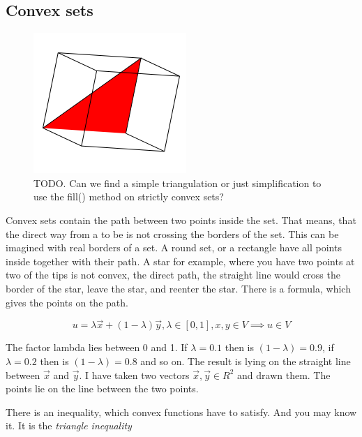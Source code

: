 \documentclass[a4paper]{article}
\begin{document}
\begin{Example}
\subsection{Convex sets}

\begin{flushleft}
\begin{figure}[ht]

\includegraphics[scale=0.5]{filling.png}
\caption{TODO. Can we find a simple triangulation or just simplification to use the fill() method on strictly convex sets?}

\end{figure}
\end{flushleft}


Convex sets contain the path between two points inside the set. That means, that the direct way from a to be is not crossing the borders of the set. This can be imagined with real borders of a set. A round set, or a rectangle have all points inside together with their path. A star for example, where you have two points at two of the tips is not convex, the direct path, the straight line would cross the border of the star, leave the star, and reenter the star. There is a formula, which gives the points on the path.

\begin{displaymath}
u = \lambda\vec{x} + (1-\lambda)\vec{y}, \lambda \in [0,1], x,y \in V \implies u \in V
\end{displaymath}

The factor lambda lies between 0 and 1. If $\lambda = 0.1$ then is $(1-\lambda) = 0.9$, if $\lambda = 0.2$ then is $(1-\lambda) = 0.8$ and so on. The result is lying on the straight line between $\vec{x}$ and $\vec{y}$. I have taken two vectors $\vec{x}, \vec{y} \in R^2$ and drawn them. The points lie on the line between the two points.

There is an inequality, which convex functions have to satisfy. And you may know it. It is the \emph{triangle inequality}


\end{Example}
\end{document}
